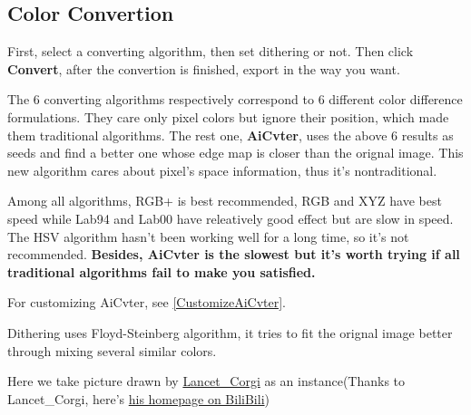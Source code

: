 \documentclass{article}
\begin{document}
    \subsection{Color Convertion}
    
    First, select a converting algorithm, then set dithering or not. Then click \textbf{Convert}, after the convertion is finished, export in the way you want.

    The 6 converting algorithms respectively correspond to 6 different color difference formulations. They care only pixel colors but ignore their position, which made them traditional algorithms. The rest one, \textbf{AiCvter}, uses the above 6 results as seeds and find a better one whose edge map is closer than the orignal image. This new algorithm cares about pixel's space information, thus it's nontraditional.
    
    Among all algorithms, RGB+ is best recommended, RGB and XYZ have best speed while Lab94 and Lab00 have releatively good effect but are slow in speed. The HSV algorithm hasn't been working well for a long time, so it's not recommended. \textbf{Besides, AiCvter is the slowest but it's worth trying if all traditional algorithms fail to make you satisfied.}

    For customizing AiCvter, see \ref{CustomizeAiCvter}.
    
    Dithering uses Floyd-Steinberg algorithm, it tries to fit the orignal image better through mixing several similar colors.
    
    Here we take picture drawn by \href{https://t.bilibili.com/544583492149793294}{Lancet\_Corgi} as an instance(Thanks to Lancet\_Corgi, here's \href{https://space.bilibili.com/37171000}{his homepage on BiliBili})
    
\end{document}
